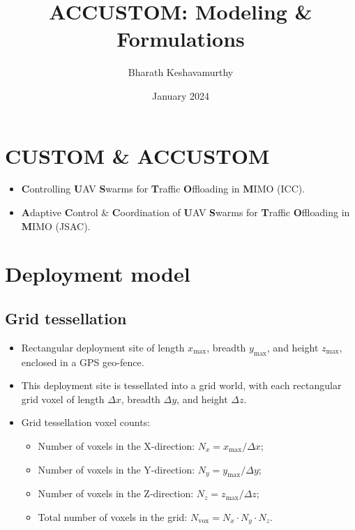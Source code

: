 \documentclass{article}
\title{ACCUSTOM: Modeling \& Formulations}
\author{Bharath Keshavamurthy}
\date{January 2024}
\begin{document}
\maketitle

\section{CUSTOM \& ACCUSTOM}
\scriptsize

\begin{itemize}
    \item \textbf{C}ontrolling \textbf{U}AV \textbf{S}warms for \textbf{T}raffic \textbf{O}ffloading in \textbf{M}IMO (ICC).
    \item \textbf{A}daptive \textbf{C}ontrol \& \textbf{C}oordination of \textbf{U}AV \textbf{S}warms for \textbf{T}raffic \textbf{O}ffloading in \textbf{M}IMO (JSAC).
\end{itemize}

\section{Deployment model}
\footnotesize

\subsection{Grid tessellation}
\begin{itemize}
    \item Rectangular deployment site of length $x_{\mathrm{max}}$, breadth $y_{\mathrm{max}}$, and height $z_{\mathrm{max}}$, enclosed in a GPS geo-fence.
    \item This deployment site is tessellated into a grid world, with each rectangular grid voxel of length $\Delta x$, breadth $\Delta y$, and height $\Delta z$.
    \item Grid tessellation voxel counts:
    \begin{itemize}
        \item Number of voxels in the X-direction: $N_{x}{=}x_{\mathrm{max}}/\Delta x$;
        \item Number of voxels in the Y-direction: $N_{y}{=}y_{\mathrm{max}}/\Delta y$;
        \item Number of voxels in the Z-direction: $N_{z}{=}z_{\mathrm{max}}/\Delta z$;
        \item Total number of voxels in the grid: $N_{\mathrm{vox}}{=}N_{x}{\cdot}N_{y}{\cdot}N_{z}$.
    \end{itemize}
\end{itemize}
\end{document}
